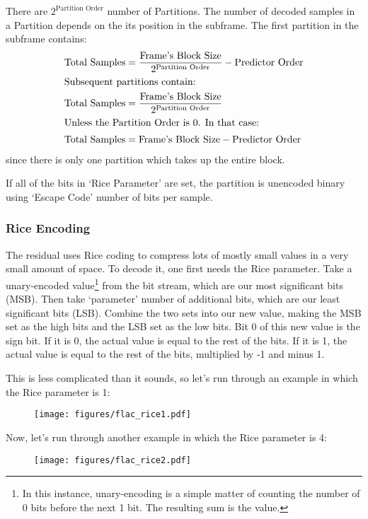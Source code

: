 There are $2 ^ \text{Partition Order}$ number of Partitions.
The number of decoded samples in a Partition depends on the
its position in the subframe.
The first partition in the subframe contains:
\begin{align}
\text{Total Samples} &= \frac{\text{Frame's Block Size}}{2 ^ {\text{Partition Order}}} - \text{Predictor Order} \\
\intertext{Subsequent partitions contain:}
\text{Total Samples} &= \frac{\text{Frame's Block Size}}{2 ^ {\text{Partition Order}}} \\
\intertext{Unless the Partition Order is 0.  In that case:}
\text{Total Samples} &= \text{Frame's Block Size} - \text{Predictor Order}
\end{align}
\noindent
since there is only one partition which takes up the entire block.

If all of the bits in `Rice Parameter' are set,
the partition is unencoded binary using `Escape Code' number of bits per
sample.

\pagebreak

\subsubsection{Rice Encoding}
The residual uses Rice coding to compress lots of mostly small values
in a very small amount of space.
To decode it, one first needs the Rice parameter.
Take a unary-encoded value\footnote{In this instance, unary-encoding is a simple matter of
counting the number of 0 bits before the next 1 bit.
The resulting sum is the value.}
from the bit stream, which are our most
significant bits (MSB).
Then take `parameter' number of additional bits, which are our least
significant bits (LSB).
Combine the two sets into our new value,
making the MSB set as the high bits and the LSB set as the low bits.
Bit 0 of this new value is the sign bit.
If it is 0, the actual value is equal to the rest of the bits.
If it is 1, the actual value is equal to the rest of the bits,
multiplied by -1 and minus 1.

This is less complicated than it sounds, so let's run through an example
in which the Rice parameter is 1:
\begin{figure}[h]
\texttt{[image: figures/flac\_rice1.pdf]}
\end{figure}

Now, let's run through another example in which the Rice parameter is 4:
\begin{figure}[h]
\texttt{[image: figures/flac\_rice2.pdf]}
\end{figure}


